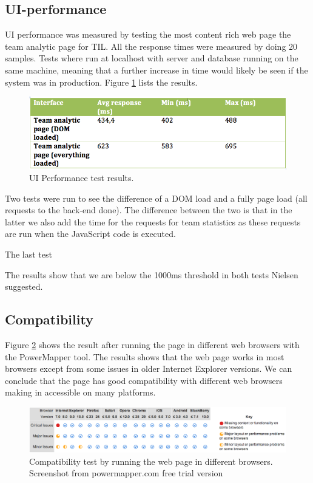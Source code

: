 \subsection{UI-performance}
UI performance was measured by testing the most content rich web page the team analytic page for \ac{TIL}. All the response times were measured by doing 20 samples. Tests where run at localhost with server and database running on the same machine, meaning that a further increase in time would likely be seen if the system was in production. Figure \ref{fig:uiperform} lists the results.

\begin{figure}[ht!]
\centering
\includegraphics[width=1\textwidth]{images/evaluation/uipeform}
\caption{UI Performance test results. }
\label{fig:uiperform}
\end{figure}

Two tests were run to see the difference of a DOM load and a fully page load (all requests to the back-end done). The difference between the two is that in the latter we also add the time for the requests for team statistics as these requests are run when the JavaScript code is executed. 

The last test 

The results show that we are below the 1000ms threshold in both tests Nielsen \cite{nielsen} suggested. 

\subsection{Compatibility}

Figure \ref{fig:compa} shows the result after running the page in different web browsers with the PowerMapper tool. The results shows that the web page works in most browsers except from some issues in older Internet Explorer versions. We can conclude that the page has good compatibility with different web browsers making in accessible on many platforms.

\begin{figure}[ht!]
\centering
\includegraphics[width=1\textwidth]{images/evaluation/compa}
\caption{Compatibility test by running the web page in different browsers. Screenshot from powermapper.com free trial version}
\label{fig:compa}
\end{figure}

